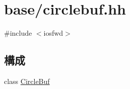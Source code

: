 \hypertarget{circlebuf_8hh}{
\section{base/circlebuf.hh}
\label{circlebuf_8hh}
}
{\ttfamily \#include $<$iosfwd$>$}\par
\subsection*{構成}
\begin{DoxyCompactItemize}
\item 
class \hyperlink{classCircleBuf}{CircleBuf}
\end{DoxyCompactItemize}
